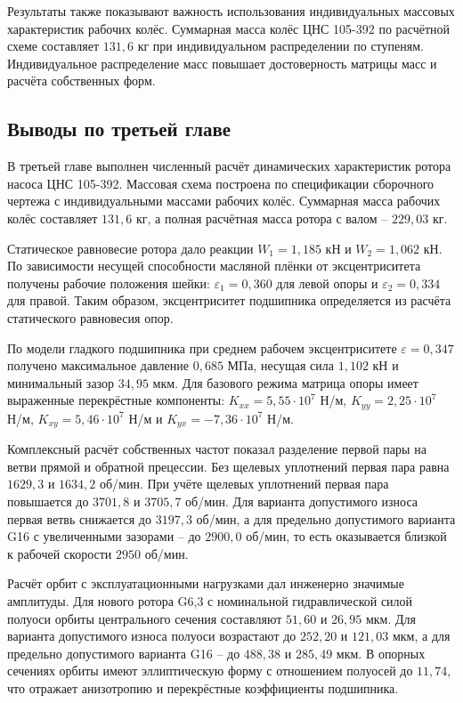 \documentclass[14pt,a4paper]{extarticle}
\numberwithin{equation}{section}
\numberwithin{figure}{section}
\numberwithin{table}{section}
\begin{document}
Результаты также показывают важность использования индивидуальных массовых характеристик рабочих колёс. Суммарная масса колёс ЦНС 105-392 по расчётной схеме составляет $131{,}6$ кг при индивидуальном распределении по ступеням. Индивидуальное распределение масс повышает достоверность матрицы масс и расчёта собственных форм.



\subsection{Выводы по третьей главе}

В третьей главе выполнен численный расчёт динамических характеристик ротора насоса ЦНС 105-392. Массовая схема построена по спецификации сборочного чертежа с индивидуальными массами рабочих колёс. Суммарная масса рабочих колёс составляет $131{,}6$ кг, а полная расчётная масса ротора с валом -- $229{,}03$ кг.

Статическое равновесие ротора дало реакции $W_1=1{,}185$ кН и $W_2=1{,}062$ кН. По зависимости несущей способности масляной плёнки от эксцентриситета получены рабочие положения шейки: $\varepsilon_1=0{,}360$ для левой опоры и $\varepsilon_2=0{,}334$ для правой. Таким образом, эксцентриситет подшипника определяется из расчёта статического равновесия опор.

По модели гладкого подшипника при среднем рабочем эксцентриситете $\varepsilon=0{,}347$ получено максимальное давление $0{,}685$ МПа, несущая сила $1{,}102$ кН и минимальный зазор $34{,}95$ мкм. Для базового режима матрица опоры имеет выраженные перекрёстные компоненты: $K_{xx}=5{,}55\cdot10^7$ Н/м, $K_{yy}=2{,}25\cdot10^7$ Н/м, $K_{xy}=5{,}46\cdot10^7$ Н/м и $K_{yx}=-7{,}36\cdot10^7$ Н/м.

Комплексный расчёт собственных частот показал разделение первой пары на ветви прямой и обратной прецессии. Без щелевых уплотнений первая пара равна $1629{,}3$ и $1634{,}2$ об/мин. При учёте щелевых уплотнений первая пара повышается до $3701{,}8$ и $3705{,}7$ об/мин. Для варианта допустимого износа первая ветвь снижается до $3197{,}3$ об/мин, а для предельно допустимого варианта G16 с увеличенными зазорами -- до $2900{,}0$ об/мин, то есть оказывается близкой к рабочей скорости $2950$ об/мин.

Расчёт орбит с эксплуатационными нагрузками дал инженерно значимые амплитуды. Для нового ротора G6,3 с номинальной гидравлической силой полуоси орбиты центрального сечения составляют $51{,}60$ и $26{,}95$ мкм. Для варианта допустимого износа полуоси возрастают до $252{,}20$ и $121{,}03$ мкм, а для предельно допустимого варианта G16 -- до $488{,}38$ и $285{,}49$ мкм. В опорных сечениях орбиты имеют эллиптическую форму с отношением полуосей до $11{,}74$, что отражает анизотропию и перекрёстные коэффициенты подшипника.
\end{document}
